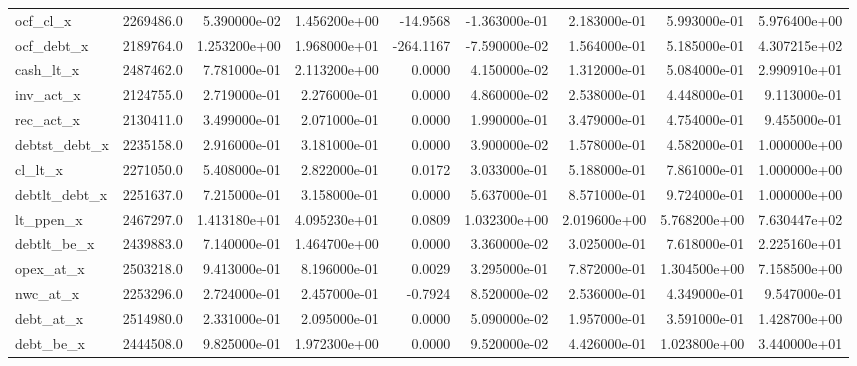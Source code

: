 \documentclass[12pt]{article}
\begin{document}
\begin{landscape}
\begin{longtable}{|l|r|r|r|r|r|r|r|r|}
ocf\_cl\_x                &  2269486.0 &  5.390000e-02 &  1.456200e+00 &    -14.9568 & -1.363000e-01 &  2.183000e-01 &  5.993000e-01 &  5.976400e+00 \\
ocf\_debt\_x              &  2189764.0 &  1.253200e+00 &  1.968000e+01 &   -264.1167 & -7.590000e-02 &  1.564000e-01 &  5.185000e-01 &  4.307215e+02 \\
cash\_lt\_x               &  2487462.0 &  7.781000e-01 &  2.113200e+00 &      0.0000 &  4.150000e-02 &  1.312000e-01 &  5.084000e-01 &  2.990910e+01 \\
inv\_act\_x               &  2124755.0 &  2.719000e-01 &  2.276000e-01 &      0.0000 &  4.860000e-02 &  2.538000e-01 &  4.448000e-01 &  9.113000e-01 \\
rec\_act\_x               &  2130411.0 &  3.499000e-01 &  2.071000e-01 &      0.0000 &  1.990000e-01 &  3.479000e-01 &  4.754000e-01 &  9.455000e-01 \\
debtst\_debt\_x           &  2235158.0 &  2.916000e-01 &  3.181000e-01 &      0.0000 &  3.900000e-02 &  1.578000e-01 &  4.582000e-01 &  1.000000e+00 \\
cl\_lt\_x                 &  2271050.0 &  5.408000e-01 &  2.822000e-01 &      0.0172 &  3.033000e-01 &  5.188000e-01 &  7.861000e-01 &  1.000000e+00 \\
debtlt\_debt\_x           &  2251637.0 &  7.215000e-01 &  3.158000e-01 &      0.0000 &  5.637000e-01 &  8.571000e-01 &  9.724000e-01 &  1.000000e+00 \\
lt\_ppen\_x               &  2467297.0 &  1.413180e+01 &  4.095230e+01 &      0.0809 &  1.032300e+00 &  2.019600e+00 &  5.768200e+00 &  7.630447e+02 \\
debtlt\_be\_x             &  2439883.0 &  7.140000e-01 &  1.464700e+00 &      0.0000 &  3.360000e-02 &  3.025000e-01 &  7.618000e-01 &  2.225160e+01 \\
opex\_at\_x               &  2503218.0 &  9.413000e-01 &  8.196000e-01 &      0.0029 &  3.295000e-01 &  7.872000e-01 &  1.304500e+00 &  7.158500e+00 \\
nwc\_at\_x                &  2253296.0 &  2.724000e-01 &  2.457000e-01 &     -0.7924 &  8.520000e-02 &  2.536000e-01 &  4.349000e-01 &  9.547000e-01 \\
debt\_at\_x               &  2514980.0 &  2.331000e-01 &  2.095000e-01 &      0.0000 &  5.090000e-02 &  1.957000e-01 &  3.591000e-01 &  1.428700e+00 \\
debt\_be\_x               &  2444508.0 &  9.825000e-01 &  1.972300e+00 &      0.0000 &  9.520000e-02 &  4.426000e-01 &  1.023800e+00 &  3.440000e+01 \\

\end{longtable}
\end{landscape}
\end{document}

